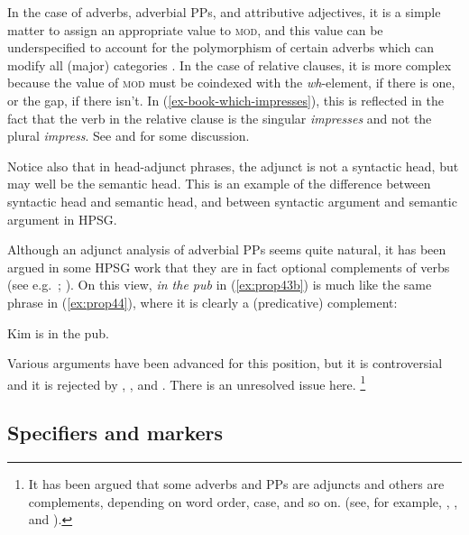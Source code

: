 \documentclass[output=paper
	        ,collection
	        ,collectionchapter
 	        ,biblatex
                ,babelshorthands
                ,newtxmath
                ,draftmode
                ,colorlinks, citecolor=brown
]{langscibook}
\begin{document}
In the case of adverbs, adverbial PPs, and attributive adjectives, it is a simple matter to assign
an appropriate value to \textsc{mod}, and this value can be underspecified to account for the
polymorphism of certain adverbs which can modify all (major) categories
\citep[--29]{AG2003b-u}. In the case of relative clauses, it is more complex because the value of
\textsc{mod} must be coindexed with the \emph{wh}-element, if there is one, or the gap, if there
isn’t. In (\ref{ex-book-which-impresses}), this is reflected in the fact that the verb in the
relative clause is the singular \emph{impresses} and not the plural \emph{impress}. See
 and  for some discussion. 

Notice also that in head-adjunct phrases, the adjunct is not a syntactic head, but may well be
the semantic head.
This is an example of the difference between syntactic head and semantic head, and between syntactic argument and semantic argument in HPSG.

Although an adjunct analysis of adverbial PPs seems quite natural, it has been argued in some HPSG work that they are in fact optional complements of verbs (see e.g.\ \citealp[4]{AG97a-u,BMS2001a}; \citealp[168, Footnote~2]{GSag2000a-u}). On this view, \emph{in the pub} in (\ref{ex:prop43b}) is much like the same phrase in (\ref{ex:prop44}), where it is clearly a (predicative) complement:

\ea\label{ex:prop44}
Kim is in the pub. 
\z

\noindent
Various arguments have been advanced for this position, but it is controversial and it is rejected by \citet{Levine2003a}, \citet[Chapter~3]{LH2006a}, and \citet{Chaves2009a}. There is an unresolved issue here.%
%
\footnote{It has been argued that some adverbs and PPs are adjuncts and others are complements,
  depending on word order, case, and so on. (see, for example, \citealp{Prze99},
  \citealp{HA2014a-u}, and ).
}
%

\subsection{Specifiers and markers}\label{sec:prop6.2}
\end{document}
